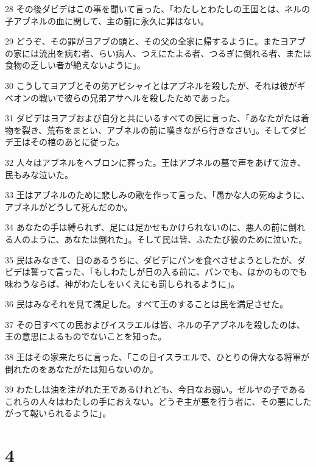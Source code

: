 \par 28 その後ダビデはこの事を聞いて言った、「わたしとわたしの王国とは、ネルの子アブネルの血に関して、主の前に永久に罪はない。
\par 29 どうぞ、その罪がヨアブの頭と、その父の全家に帰するように。またヨアブの家には流出を病む者、らい病人、つえにたよる者、つるぎに倒れる者、または食物の乏しい者が絶えないように」。
\par 30 こうしてヨアブとその弟アビシャイとはアブネルを殺したが、それは彼がギベオンの戦いで彼らの兄弟アサヘルを殺したためであった。
\par 31 ダビデはヨアブおよび自分と共にいるすべての民に言った、「あなたがたは着物を裂き、荒布をまとい、アブネルの前に嘆きながら行きなさい」。そしてダビデ王はその棺のあとに従った。
\par 32 人々はアブネルをヘブロンに葬った。王はアブネルの墓で声をあげて泣き、民もみな泣いた。
\par 33 王はアブネルのために悲しみの歌を作って言った、「愚かな人の死ぬように、アブネルがどうして死んだのか。
\par 34 あなたの手は縛られず、足には足かせもかけられないのに、悪人の前に倒れる人のように、あなたは倒れた」。そして民は皆、ふたたび彼のために泣いた。
\par 35 民はみなきて、日のあるうちに、ダビデにパンを食べさせようとしたが、ダビデは誓って言った、「もしわたしが日の入る前に、パンでも、ほかのものでも味わうならば、神がわたしをいくえにも罰しられるように」。
\par 36 民はみなそれを見て満足した。すべて王のすることは民を満足させた。
\par 37 その日すべての民およびイスラエルは皆、ネルの子アブネルを殺したのは、王の意思によるものでないことを知った。
\par 38 王はその家来たちに言った、「この日イスラエルで、ひとりの偉大なる将軍が倒れたのをあなたがたは知らないのか。
\par 39 わたしは油を注がれた王であるけれども、今日なお弱い。ゼルヤの子であるこれらの人々はわたしの手におえない。どうぞ主が悪を行う者に、その悪にしたがって報いられるように」。

\chapter{4}

